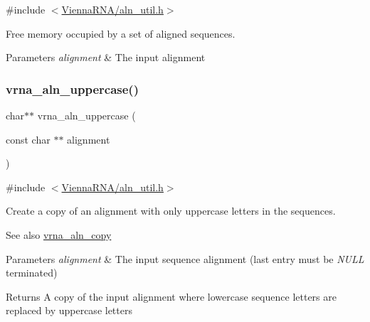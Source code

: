 {\ttfamily \#include $<$\hyperlink{aln__util_8h}{Vienna\+R\+N\+A/aln\+\_\+util.\+h}$>$}



Free memory occupied by a set of aligned sequences. 


\begin{DoxyParams}{Parameters}
{\em alignment} & The input alignment \\
\hline
\end{DoxyParams}
\mbox{\label{group__aln__utils_ga3a0476a71c4bae3d302790de58055704}} 
\subsubsection{\texorpdfstring{vrna\+\_\+aln\+\_\+uppercase()}{vrna\_aln\_uppercase()}}
{\footnotesize\ttfamily char$\ast$$\ast$ vrna\+\_\+aln\+\_\+uppercase (\begin{DoxyParamCaption}\item[{const char $\ast$$\ast$}]{alignment }\end{DoxyParamCaption})}



{\ttfamily \#include $<$\hyperlink{aln__util_8h}{Vienna\+R\+N\+A/aln\+\_\+util.\+h}$>$}



Create a copy of an alignment with only uppercase letters in the sequences. 

\begin{DoxySeeAlso}{See also}
\hyperlink{group__aln__utils_ga08cdca592461436860daf9738279ce17}{vrna\+\_\+aln\+\_\+copy}
\end{DoxySeeAlso}

\begin{DoxyParams}{Parameters}
{\em alignment} & The input sequence alignment (last entry must be {\itshape N\+U\+LL} terminated) \\
\hline
\end{DoxyParams}
\begin{DoxyReturn}{Returns}
A copy of the input alignment where lowercase sequence letters are replaced by uppercase letters 
\end{DoxyReturn}
\mbox{\label{group__aln__utils_ga7886fc678553c06472a712a335cde9cf}} 
